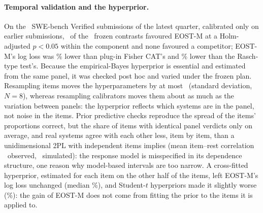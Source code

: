 \paragraph{Temporal validation and the hyperprior.} On the \TempTargets\ SWE-bench
Verified submissions of the latest quarter, calibrated only on earlier submissions,
\TempNSig\ of the \TempNTests\ frozen contrasts favoured EOST-M at a Holm-adjusted $p<0.05$
within the component and none favoured a competitor; EOST-M's log loss was \TempRTwoMed\% lower than plug-in
Fisher CAT's and \TempCOneMed\% lower than the Rasch-type test's. Because the empirical-Bayes
hyperprior is essential and estimated from the same panel, it was checked post hoc and varied
under the frozen plan. Resampling items moves the hyperparameters by at most
\EBItemsSdMaxEight\ (standard deviation, $N=8$), whereas resampling calibrators moves them
about as much as the variation between panels: the hyperprior reflects which systems are in
the panel, not noise in the items. Prior predictive checks reproduce the spread of the
items' proportions correct, but the share of items with identical panel verdicts only on
average, and real systems agree with each other less, item by item, than a unidimensional
2PL with independent items implies (mean item--rest correlation \PPCRestObs\ observed,
\PPCRestSim\ simulated): the response model is misspecified in its dependence structure, one
reason why model-based intervals are too narrow. A cross-fitted hyperprior, estimated for
each item on the other half of the items, left EOST-M's log loss unchanged (median
\SecXfVsEostMedAbs\%), and Student-$t$ hyperpriors made it slightly worse
(\SecTpVsEostMedAbs\%): the gain of EOST-M does not come from fitting the prior to the items
it is applied to.
